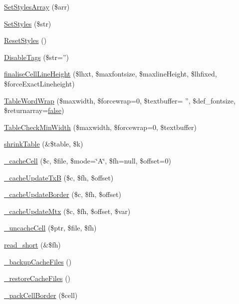 \begin{DoxyCompactItemize}
\item 
\hyperlink{classm_p_d_f_ada7b64b960d2ec83ee76b6794288919f}{Set\-Styles\-Array} (\$arr)
\item 
\hyperlink{classm_p_d_f_a2952e70e769d9cc342169e44e08b815c}{Set\-Styles} (\$str)
\item 
\hyperlink{classm_p_d_f_a75702d40b5b2893dc367970a58f1683d}{Reset\-Styles} ()
\item 
\hyperlink{classm_p_d_f_a0d38eb32de4938aa1a67413bb8a486bf}{Disable\-Tags} (\$str='')
\item 
\hyperlink{classm_p_d_f_ab79d687ca922b6aac81f3cb86528c831}{finalise\-Cell\-Line\-Height} (\$lhxt, \$maxfontsize, \$maxline\-Height, \$lhfixed, \$force\-Exact\-Lineheight)
\item 
\hyperlink{classm_p_d_f_a593f874329d4ed870d8541344717f76c}{Table\-Word\-Wrap} (\$maxwidth, \$forcewrap=0, \$textbuffer= '', \$def\-\_\-fontsize, \$returnarray=\hyperlink{ttfontsuni_8php_afbaa04e5cc97693dc668b3c45d3dd740}{false})
\item 
\hyperlink{classm_p_d_f_a45a92d84269c805aab77e35a1a4f5c07}{Table\-Check\-Min\-Width} (\$maxwidth, \$forcewrap=0, \$textbuffer)
\item 
\hyperlink{classm_p_d_f_a573f2e1bac8b64c01ddf87887187e874}{shrink\-Table} (\&\$table, \$k)
\item 
\hyperlink{classm_p_d_f_aa0850a41c90d86edaf07f20c1135d523}{\-\_\-cache\-Cell} (\$c, \$file, \$mode=\char`\"{}A\char`\"{}, \$fh=null, \$offset=0)
\item 
\hyperlink{classm_p_d_f_aa11bb669fde2310d784168937567455f}{\-\_\-cache\-Update\-Tx\-B} (\$c, \$fh, \$offset)
\item 
\hyperlink{classm_p_d_f_a69d1ad2db0ddce74866d445eb4dc5887}{\-\_\-cache\-Update\-Border} (\$c, \$fh, \$offset)
\item 
\hyperlink{classm_p_d_f_abfa8cec5d90ddfe9bcad6470e70ad799}{\-\_\-cache\-Update\-Mtx} (\$c, \$fh, \$offset, \$var)
\item 
\hyperlink{classm_p_d_f_a88e2d235df5672dd97aa9168ee18e85a}{\-\_\-uncache\-Cell} (\$ptr, \$file, \$fh)
\item 
\hyperlink{classm_p_d_f_aac588f9e66c1a9872ee1921ff3454250}{read\-\_\-short} (\&\$fh)
\item 
\hyperlink{classm_p_d_f_ac13528095a2f60678a2e28d6ec3cad93}{\-\_\-backup\-Cache\-Files} ()
\item 
\hyperlink{classm_p_d_f_a51193c6f807e6fb6743ca5c4e713f3f1}{\-\_\-restore\-Cache\-Files} ()
\item 
\hyperlink{classm_p_d_f_a541b230dd3f44aba9929f1ea0172b2d1}{\-\_\-pack\-Cell\-Border} (\$cell)

\end{DoxyCompactItemize}
